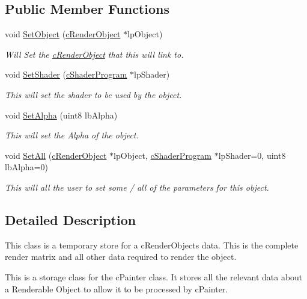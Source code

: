 \subsection*{Public Member Functions}
\begin{DoxyCompactItemize}
\item 
\hypertarget{classc_render_pointer_a896535cf0d3f8282aac2c2a1694f554e}{
void \hyperlink{classc_render_pointer_a896535cf0d3f8282aac2c2a1694f554e}{SetObject} (\hyperlink{classc_render_object}{cRenderObject} $\ast$lpObject)}
\label{classc_render_pointer_a896535cf0d3f8282aac2c2a1694f554e}

\begin{DoxyCompactList}\small\item\em Will Set the \hyperlink{classc_render_object}{cRenderObject} that this will link to. \end{DoxyCompactList}\item 
\hypertarget{classc_render_pointer_a7a20298c7c71e5eada122331d3ea95e5}{
void \hyperlink{classc_render_pointer_a7a20298c7c71e5eada122331d3ea95e5}{SetShader} (\hyperlink{classc_shader_program}{cShaderProgram} $\ast$lpShader)}
\label{classc_render_pointer_a7a20298c7c71e5eada122331d3ea95e5}

\begin{DoxyCompactList}\small\item\em This will set the shader to be used by the object. \end{DoxyCompactList}\item 
\hypertarget{classc_render_pointer_ab3ce6cb1be6ce831cff714e6a34a90bb}{
void \hyperlink{classc_render_pointer_ab3ce6cb1be6ce831cff714e6a34a90bb}{SetAlpha} (uint8 lbAlpha)}
\label{classc_render_pointer_ab3ce6cb1be6ce831cff714e6a34a90bb}

\begin{DoxyCompactList}\small\item\em This will set the Alpha of the object. \end{DoxyCompactList}\item 
\hypertarget{classc_render_pointer_ae4214302885c3ee6185e10ca42f6422e}{
void \hyperlink{classc_render_pointer_ae4214302885c3ee6185e10ca42f6422e}{SetAll} (\hyperlink{classc_render_object}{cRenderObject} $\ast$lpObject, \hyperlink{classc_shader_program}{cShaderProgram} $\ast$lpShader=0, uint8 lbAlpha=0)}
\label{classc_render_pointer_ae4214302885c3ee6185e10ca42f6422e}

\begin{DoxyCompactList}\small\item\em This will all the user to set some / all of the parameters for this object. \end{DoxyCompactList}\end{DoxyCompactItemize}


\subsection{Detailed Description}
This class is a temporary store for a cRenderObjects data. This is the complete render matrix and all other data required to render the object. 

This is a storage class for the cPainter class. It stores all the relevant data about a Renderable Object to allow it to be processed by cPainter. 